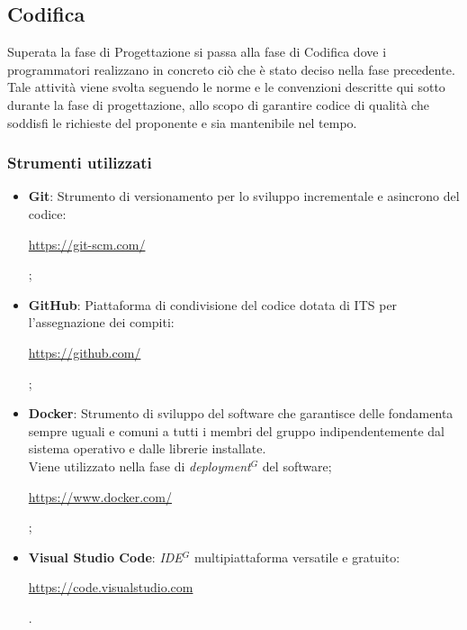 \nonstopmode
\subsection{Codifica}
Superata la fase di Progettazione si passa alla fase di Codifica dove i programmatori
realizzano in concreto ciò che è stato deciso nella fase precedente.
Tale attività viene svolta seguendo le norme e le convenzioni descritte qui sotto durante la fase di progettazione, allo
scopo di garantire codice di qualità che soddisfi le richieste del proponente e sia mantenibile nel tempo.

\subsubsection{Strumenti utilizzati}

\begin{itemize}
\item \textbf{Git}: Strumento di versionamento per lo sviluppo incrementale e asincrono del codice: \begin{center} \url{https://git-scm.com/} \end{center};
\item \textbf{GitHub}: Piattaforma di condivisione del codice dotata di ITS per l'assegnazione dei compiti: \begin{center} \url{https://github.com/} \end{center};
\item \textbf{Docker}: Strumento di sviluppo del software che garantisce delle fondamenta sempre uguali e comuni a tutti i membri del gruppo indipendentemente dal sistema operativo e dalle librerie installate. \\ Viene utilizzato nella fase di \emph{deployment}$^{G}$ del software; \begin{center} \url{https://www.docker.com/} \end{center};
\item \textbf{Visual Studio Code}: \emph{IDE}$^{G}$ multipiattaforma versatile e gratuito: \begin{center} \url{https://code.visualstudio.com} \end{center}.
\end{itemize}

